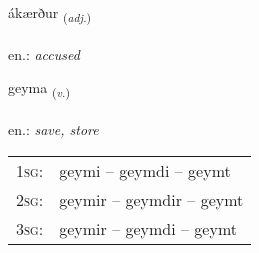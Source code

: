 \documentclass[frontgrid, backgrid]{flacards}\usepackage[]{graphicx}\usepackage[]{xcolor}
\begin{document}
\renewcommand{\flhead}{\vskip5pt \fboxsep=0pt {\small\bfseries\footnotesize Lýsingarorð | Adjective}}
\renewcommand{\fcfoot}{\vskip5pt \fboxsep=0pt \hspace{2pt}{\small\bfseries\footnotesize 1K}}

\renewcommand{\blhead}{\vskip5pt {\small\bfseries\footnotesize Lýsingarorð | Adjective }}
\renewcommand{\bcfoot}{\vskip5pt \hspace{2pt}{\small\bfseries\footnotesize 1K}}


{ákærður \small{\textsubscript{(\textit{adj.})}} \\[1ex] %
\textphonetic{[auːcʰairðʏr]} \\
en.: \emph{accused} \\  [2ex]
\renewcommand*{\arraystretch}{0.8}
}

\renewcommand{\flhead}{\vskip5pt \fboxsep=0pt {\small\bfseries\footnotesize Sagnorð | Verb}}
\renewcommand{\fcfoot}{\vskip5pt \fboxsep=0pt \hspace{2pt}{\small\bfseries\footnotesize 1K}}

\renewcommand{\blhead}{\vskip5pt {\small\bfseries\footnotesize Sagnorð | Verb }}
\renewcommand{\bcfoot}{\vskip5pt \hspace{2pt}{\small\bfseries\footnotesize 1K}}


{geyma \small{\textsubscript{(\textit{v.})}} \\[1ex] %
\textphonetic{[ceiːma]} \\
en.: \emph{save, store} \\  [2ex]
\renewcommand*{\arraystretch}{0.8}
\begin{tabular}{p{1cm}l}
\textsc{1sg}: & geymi -- geymdi -- geymt \\ 
\textsc{2sg}: & geymir -- geymdir -- geymt \\ 
\textsc{3sg}: & geymir -- geymdi -- geymt \\ 
\end{tabular}
}
\end{document}
